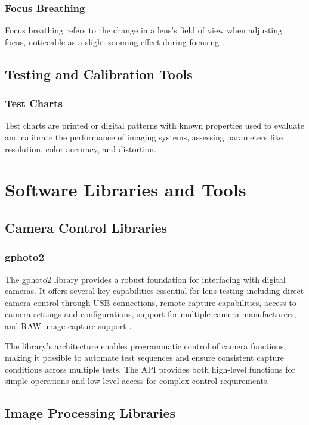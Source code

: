 \subsubsection{Focus Breathing}
Focus breathing refers to the change in a lens's field of view when adjusting focus, noticeable as a slight zooming effect during focusing \cite{FocusBreathing}.

\subsection{Testing and Calibration Tools}

\subsubsection{Test Charts}
Test charts are printed or digital patterns with known properties used to evaluate and calibrate the performance of imaging systems, assessing parameters like resolution, color accuracy, and distortion.

\section{Software Libraries and Tools}

\subsection{Camera Control Libraries}
\subsubsection{gphoto2}
The gphoto2 library provides a robust foundation for interfacing with digital cameras. It offers several key capabilities essential for lens testing including direct camera control through USB connections, remote capture capabilities, access to camera settings and configurations, support for multiple camera manufacturers, and RAW image capture support \cite{gphoto2}.

The library's architecture enables programmatic control of camera functions, making it possible to automate test sequences and ensure consistent capture conditions across multiple tests. The API provides both high-level functions for simple operations and low-level access for complex control requirements.

\subsection{Image Processing Libraries}
